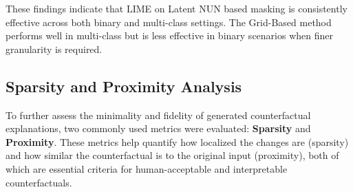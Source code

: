 \begin{table}[htbp]
\centering
{}
\caption{Comparison of counterfactual explanation validity across masking methods.}
\label{tab:ce_validity}
\end{table}

These findings indicate that LIME on Latent NUN based masking is consistently effective across both binary and multi-class settings. The Grid-Based method performs well in multi-class but is less effective in binary scenarios when finer granularity is required.



\subsection{Sparsity and Proximity Analysis}

To further assess the minimality and fidelity of generated counterfactual explanations, two commonly used metrics were evaluated: \textbf{Sparsity} and \textbf{Proximity}. These metrics help quantify how localized the changes are (sparsity) and how similar the counterfactual is to the original input (proximity), both of which are essential criteria for human-acceptable and interpretable counterfactuals.

